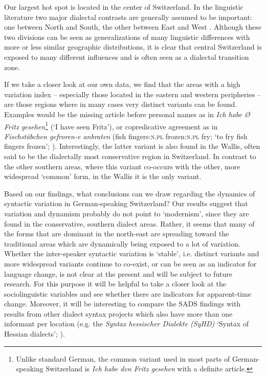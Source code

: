 \documentclass[output=paper]{LSP/langsci}
\begin{document}
Our largest hot spot is located in the center of Switzerland. In the linguistic literature two major dialectal contrasts are generally assumed to be important: one between North and South, the other between East and West \citep[61-67]{haas_deutschsprachige_2000}. Although these two divisions can be seen as generalizations of many linguistic differences with more or less similar geographic distributions, it is clear that central Switzerland is exposed to many different influences and is often seen as a dialectal transition zone.

If we take a closer look at our own data, we find that the areas with a high variation index – especially those located in the eastern and western peripheries – are those regions where in many cases very distinct variants can be found. Examples would be the missing article before personal names as in \emph{Ich habe Ø Fritz gesehen}\footnote{ Unlike standard German, the common variant used in most parts of German-speaking Switzerland is \textit{Ich habe den Fritz gesehen} with a definite article.} (‘I have seen Fritz’), or copredicative agreement as in \emph{Fischstäbchen gefroren-e anbraten} (fish fingers:\textsc{n.pl} frozen:\textsc{n.pl} fry; ‘to fry fish fingers frozen’; \citealt{berger_depictive_2005}). Interestingly, the latter variant is also found in the Wallis, often said to be the dialectally most conservative region in Switzerland. In contrast to the other southern areas, where this variant co-occurs with the other, more widespread ‘common’ form, in the Wallis it is the only variant.

Based on our findings, what conclusions can we draw regarding the dynamics of syntactic variation in German-speaking Switzerland? Our results suggest that variation and dynamism probably do not point to ‘modernism’, since they are found in the conservative, southern dialect areas. Rather, it seems that many of the forms that are dominant in the north-east are spreading toward the traditional areas which are dynamically being exposed to a lot of variation. Whether the inter-speaker syntactic variation is ‘stable’, i.e. distinct variants and more widespread variants continue to co-exist, or can be seen as an indicator for language change, is not clear at the present \citep{glaser_wandel_2014} and will be subject to future research. For this purpose it will be helpful to take a closer look at the sociolinguistic variables and see whether there are indicators for apparent-time change. Moreover, it will be interesting to compare the SADS findings with results from other dialect syntax projects which also have more than one informant per location (e.g. the \emph{Syntax hessischer Dialekte (SyHD)} ‘Syntax of Hessian dialects’; \citealt{fleischer_erhebung_2012}). 
\end{document}
